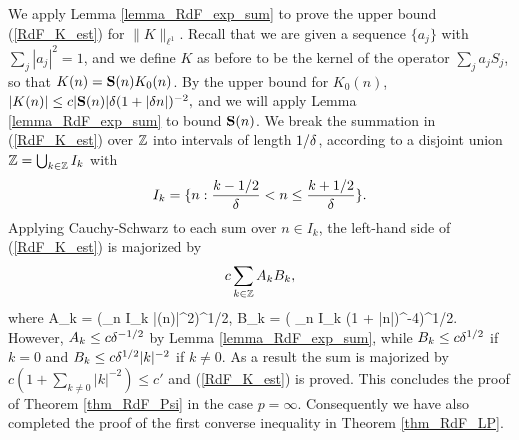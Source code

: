 \documentclass[oneside,11pt]{amsart}
\begin{document}
We apply Lemma  \ref{lemma_RdF_exp_sum} to prove the    upper bound (\ref{RdF_K_est}) for $\| K \|_{\ell^1}$. 
Recall that we are given  a sequence $\{a_j\}$ with $\sum_j |a_j|^2=1$, and we define $K$ as before to be the kernel of the operator $\sum_j a_j S_j$, so that $K(n) = \mathbf{S}(n) K_0(n)$. By the upper bound for $K_0(n)$, 
$ |K(n)| \leq c |\mathbf{S}(n)| \delta (1+ |\delta n|)^{-2},
$
and we will apply Lemma \ref{lemma_RdF_exp_sum} to bound $\mathbf{S}(n)$.
We break the summation in (\ref{RdF_K_est}) over $\mathbb{Z}$ into intervals of length $1/\delta$, according to a disjoint union 
 $ \mathbb{Z} = \bigcup_{k \in \mathbb{Z}} I_k $
with 
\[ I_k = \{ n : \frac{k-1/2}{\delta} < n \leq \frac{k+1/2}{\delta} \}.\]
Applying Cauchy-Schwarz to each sum over $n \in I_k$,  the left-hand side of (\ref{RdF_K_est}) is majorized by 
\[ c \sum_{k \in \mathbb{Z}} A_k B_k,\]
 where 
\beq\label{RdF_AkBk}
 A_k  = (\sum_{n \in I_k} |\Sbf(n)|^2)^{1/2}, \qquad B_k = \del ( \sum_{n \in I_k} (1 + |\del n|)^{-4})^{1/2}.
 \eeq
However, $A_k \leq c\delta^{-1/2}$ by Lemma \ref{lemma_RdF_exp_sum}, while $B_k \leq c \delta^{1/2}$ if $k=0$ and $B_k \leq c \delta^{1/2} |k|^{-2}$ if $k \neq 0$.
As a result the sum is majorized by 
$ c( 1 + \sum_{k \neq 0} |k|^{-2}) \leq c'$
and  (\ref{RdF_K_est}) is proved. This concludes the proof of Theorem \ref{thm_RdF_Psi} in the case $p = \infty$. Consequently we have also completed the proof of  the first converse inequality in Theorem \ref{thm_RdF_LP}.
 
 
 
\end{document}
